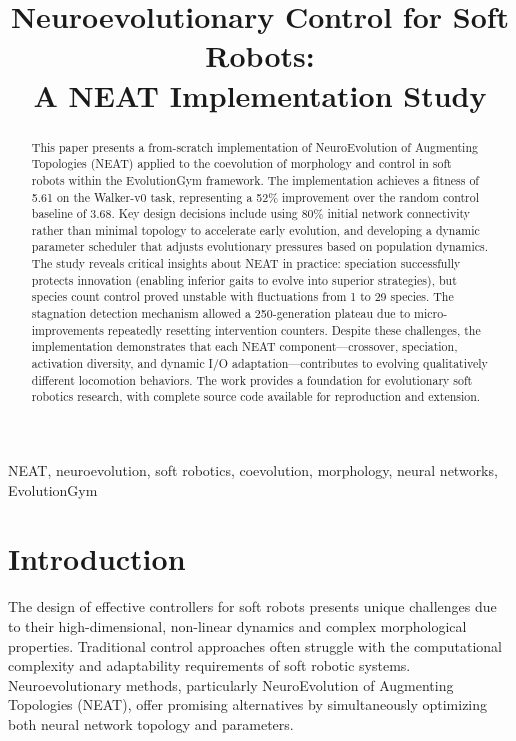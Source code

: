 \documentclass[conference]{IEEEtran}
\begin{document}
\title{Neuroevolutionary Control for Soft Robots: \\ A NEAT Implementation Study}

\author{
}

\maketitle

\begin{abstract}
This paper presents a from-scratch implementation of NeuroEvolution of Augmenting Topologies (NEAT) applied to the coevolution of morphology and control in soft robots within the EvolutionGym framework. The implementation achieves a fitness of 5.61 on the Walker-v0 task, representing a 52\% improvement over the random control baseline of 3.68. Key design decisions include using 80\% initial network connectivity rather than minimal topology to accelerate early evolution, and developing a dynamic parameter scheduler that adjusts evolutionary pressures based on population dynamics. The study reveals critical insights about NEAT in practice: speciation successfully protects innovation (enabling inferior gaits to evolve into superior strategies), but species count control proved unstable with fluctuations from 1 to 29 species. The stagnation detection mechanism allowed a 250-generation plateau due to micro-improvements repeatedly resetting intervention counters. Despite these challenges, the implementation demonstrates that each NEAT component—crossover, speciation, activation diversity, and dynamic I/O adaptation—contributes to evolving qualitatively different locomotion behaviors. The work provides a foundation for evolutionary soft robotics research, with complete source code available for reproduction and extension.
\end{abstract}

\begin{IEEEkeywords}
NEAT, neuroevolution, soft robotics, coevolution, morphology, neural networks, EvolutionGym
\end{IEEEkeywords}

\section{Introduction}
The design of effective controllers for soft robots presents unique challenges due to their high-dimensional, non-linear dynamics and complex morphological properties. Traditional control approaches often struggle with the computational complexity and adaptability requirements of soft robotic systems. Neuroevolutionary methods, particularly NeuroEvolution of Augmenting Topologies (NEAT), offer promising alternatives by simultaneously optimizing both neural network topology and parameters.
\end{document}

